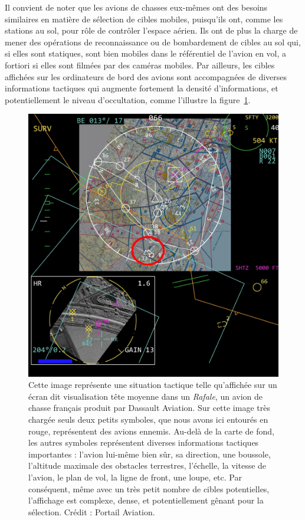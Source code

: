	Il convient de noter que les avions de chasses eux-mêmes ont des besoins similaires en matière de sélection de cibles mobiles, puisqu'ils ont, comme les stations au sol, pour rôle de contrôler l'espace aérien. Ils ont de plus la charge de mener des opérations de reconnaissance ou de bombardement de cibles au sol qui, si elles sont statiques, sont bien mobiles dans le référentiel de l'avion en vol, a fortiori si elles sont filmées par des caméras mobiles. Par ailleurs, les cibles affichées sur les ordinateurs de bord des avions sont accompagnées de diverses informations tactiques qui augmente fortement la densité d'informations, et potentiellement le niveau d'occultation, comme l'illustre la figure~\ref{fig:sitac}.
	
	\begin{figure}[H]
		\centering
		\includegraphics[width=\textwidth]{figures/ch1/sitac}
		\caption[Situation tactique vue d'un \emph{Rafale}.]{Cette image représente une situation tactique telle qu'affichée sur un écran dit \og visualisation tête moyenne \fg{} dans un \emph{Rafale}, un avion de chasse français produit par Dassault Aviation. Sur cette image très \og chargée \fg{} seuls deux petits symboles, que nous avons ici entourés en rouge, représentent des avions ennemis. Au-delà de la carte de fond, les autres symboles représentent diverses informations tactiques importantes : l'avion lui-même bien sûr, sa direction, une boussole, l'altitude maximale des obstacles terrestres, l'échelle, la vitesse de l'avion, le plan de vol, la ligne de front, une loupe, etc. Par conséquent, même avec un très petit nombre de cibles potentielles, l'affichage est complexe, dense, et potentiellement gênant pour la sélection. Crédit : Portail Aviation\footnotemark.}
		\label{fig:sitac}
	\end{figure}
	
